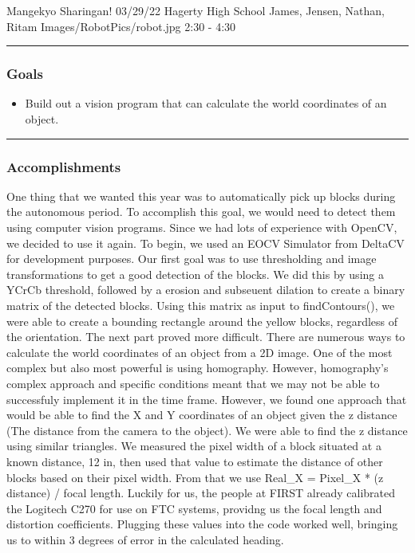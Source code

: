\insertmeeting 
	{Mangekyo Sharingan!} 
	{03/29/22} 
	{Hagerty High School}
	{James, Jensen, Nathan, Ritam}
	{Images/RobotPics/robot.jpg}
	{2:30 - 4:30}
	
\noindent\hfil\rule{\textwidth}{.4pt}\hfil
\subsubsection*{Goals}
\begin{itemize}
    \item Build out a vision program that can calculate the world coordinates of an object. 

\end{itemize} 

\noindent\hfil\rule{\textwidth}{.4pt}\hfil

\subsubsection*{Accomplishments}
One thing that we wanted this year was to automatically pick up blocks during the autonomous period. To accomplish this goal, we would need to detect them using computer vision programs. Since we had lots of experience with OpenCV, we decided to use it again. To begin, we used an EOCV Simulator from DeltaCV for development purposes. Our first goal was to use thresholding and image transformations to get a good detection of the blocks. We did this by using a YCrCb threshold, followed by a erosion and subseuent dilation to create a binary matrix of the detected blocks. Using this matrix as input to findContours(), we were able to create a bounding rectangle around the yellow blocks, regardless of the orientation. The next part proved more difficult. There are numerous ways to calculate the world coordinates of an object from a 2D image. One of the most complex but also most powerful is using homography. However, homography's complex approach and specific conditions meant that we may not be able to successfuly implement it in the time frame. However, we found one approach that would be able to find the X and Y coordinates of an object given the z distance (The distance from the camera to the object). We were able to find the z distance using similar triangles. We measured the pixel width of a block situated at a known distance, 12 in, then used that value to estimate the distance of other blocks based on their pixel width. From that we use Real_X = Pixel_X * (z distance) / focal length. Luckily for us, the people at FIRST already calibrated the Logitech C270 for use on FTC systems, providng us the focal length and distortion coefficients. Plugging these values into the code worked well, bringing us to within 3 degrees of error in the calculated heading. 


